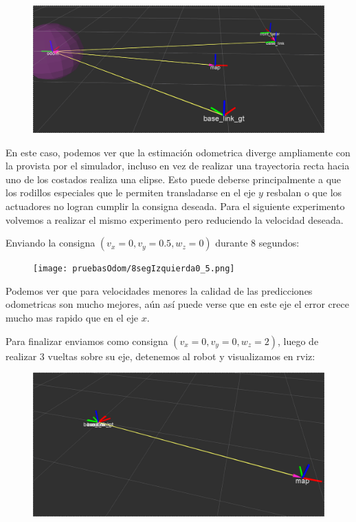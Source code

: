 \begin{figure}[!htb]
\includegraphics[width=\linewidth]{pruebasOdom/8segIzquierda2.png}
\end{figure}

En este caso, podemos ver que la estimación odometrica diverge ampliamente con la provista por el simulador, incluso en vez de realizar una trayectoria recta hacia uno de los costados realiza una elipse. Esto puede deberse principalmente a que los rodillos especiales que le permiten transladarse en el eje $y$ resbalan o que los actuadores no logran cumplir la consigna deseada. Para el siguiente experimento volvemos a realizar el mismo experimento pero reduciendo la velocidad deseada.


Enviando la consigna $(v_x = 0, v_y=0.5,w_z=0)$ durante 8 segundos: 

\begin{figure}[!htb]
\texttt{[image: pruebasOdom/8segIzquierda0\_5.png]}
\end{figure}

Podemos ver que para velocidades menores la calidad de las predicciones odometricas son mucho mejores, aún así puede verse que en este eje el error crece mucho mas rapido que en el eje $x$.

Para finalizar enviamos como consigna $(v_x = 0, v_y=0,w_z=2)$, luego de realizar 3 vueltas sobre su eje, detenemos al robot y visualizamos en rviz:

\begin{figure}[!htb]
\includegraphics[width=\linewidth]{pruebasOdom/3Vueltas2Vel.png}
\end{figure}

